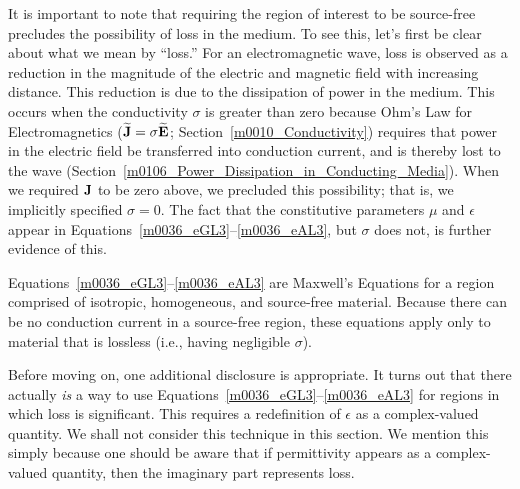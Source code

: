 It is important to note that requiring the region of interest to be source-free precludes the possibility of loss in the medium.
To see this, let's first be clear about what we mean by ``loss.''
For an electromagnetic wave, loss is observed as a reduction in the magnitude of the electric and magnetic field with increasing distance.
This reduction is due to the dissipation of power in the medium.
This occurs when the conductivity $\sigma$ is greater than zero because Ohm's Law for Electromagnetics 
($\widetilde{\bf J}=\sigma\widetilde{\bf E}$; Section~\ref{m0010_Conductivity}) requires that power in the electric field be transferred into conduction current, and is thereby lost to the wave (Section~\ref{m0106_Power_Dissipation_in_Conducting_Media}).
When we required ${\bf J}$ to be zero above, we precluded this possibility; that is, we implicitly specified $\sigma=0$.
The fact that the constitutive parameters $\mu$ and $\epsilon$ appear in Equations~\ref{m0036_eGL3}--\ref{m0036_eAL3}, but $\sigma$ does not, is further evidence of this.

\begin{mdframed}[backgroundcolor=yellow!20,nobreak=true]
Equations~\ref{m0036_eGL3}--\ref{m0036_eAL3} are Maxwell's Equations 
for a region comprised of isotropic, homogeneous, and source-free material.
Because there can be no conduction current in a source-free region, these equations apply only to material that is lossless (i.e., having negligible $\sigma$).
\end{mdframed}

Before moving on, one additional disclosure is appropriate. It turns out that there actually \emph{is} a way to use Equations~\ref{m0036_eGL3}--\ref{m0036_eAL3} for regions in which loss is significant.  This requires a redefinition of $\epsilon$ as a complex-valued quantity.  We shall not consider this technique in this section.  We mention this simply because one should be aware that if permittivity
appears as a complex-valued quantity, then the imaginary part represents loss.


